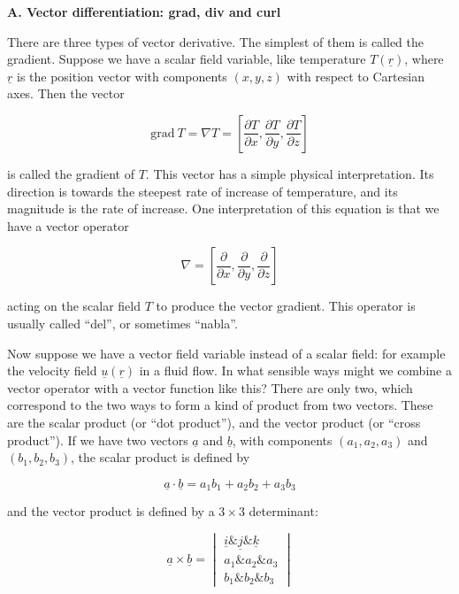   \textbf{A. Vector differentiation: grad, div and curl} 

  There are three types of vector derivative. The simplest of them is called 
  the gradient. Suppose we have a scalar field variable, like temperature 
  $T(\underline{r})$, where $\underline{r}$ is the position vector with 
  components $(x,y,z)$ with respect to Cartesian axes. Then the vector 

  \begin{equation*}\mathrm{grad~}T = \nabla T = \left[\dfrac{\partial 
  T}{\partial x},\dfrac{\partial T}{\partial y},\dfrac{\partial T}{\partial 
  z}\right] \tag{2}\end{equation*} 

  \noindent{}is called the gradient of $T$. This vector has a simple physical 
  interpretation. Its direction is towards the steepest rate of increase of 
  temperature, and its magnitude is the rate of increase. One interpretation of 
  this equation is that we have a vector operator 

  \begin{equation*}\nabla = \left[\dfrac{\partial }{\partial x},\dfrac{\partial 
  }{\partial y},\dfrac{\partial }{\partial z}\right] \tag{3}\end{equation*} 

  \noindent{}acting on the scalar field $T$ to produce the vector gradient. 
  This operator is usually called ``del'', or sometimes ``nabla''. 

  Now suppose we have a vector field variable instead of a scalar field: for 
  example the velocity field $\underline{u}(\underline{r})$ in a fluid flow. In 
  what sensible ways might we combine a vector operator with a vector function 
  like this? There are only two, which correspond to the two ways to form a 
  kind of product from two vectors. These are the scalar product (or ``dot 
  product''), and the vector product (or ``cross product''). If we have two 
  vectors $\underline{a}$ and $\underline{b}$, with components $(a_1,a_2,a_3)$ 
  and $(b_1,b_2,b_3)$, the scalar product is defined by 

  \begin{equation*}\underline{a}\cdot \underline{b} = a_1b_1+a_2b_2+a_3b_3 
  \tag{4}\end{equation*} 

  \noindent{}and the vector product is defined by a $3 \times 3$ determinant: 

  \begin{equation*}\underline{a} \times \underline{b} = \begin{vmatrix} 
  \underline{i}\&\underline{j}\&\underline{k}\\a_1\&a_2\&a_3\\b_1\&b_2\&b_3 
  \end{vmatrix}\end{equation*} 


